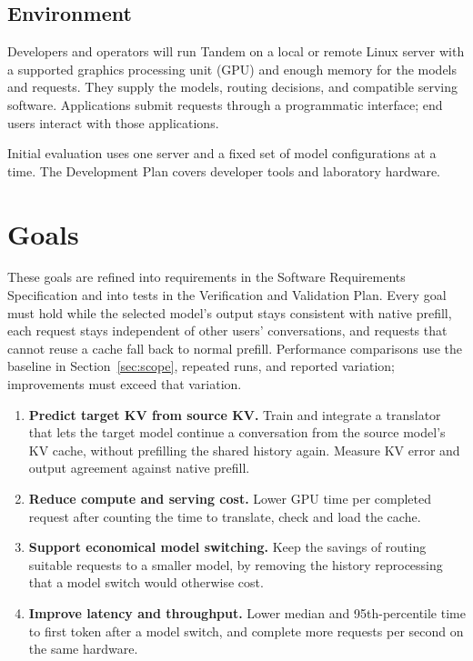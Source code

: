 \documentclass[11pt]{article}
\begin{document}
\subsection{Environment}

Developers and operators will run Tandem on a local or remote Linux server
with a supported graphics processing unit (GPU) and enough memory for the
models and requests. They supply the models, routing decisions, and
compatible serving software. Applications submit requests through a
programmatic interface; end users interact with those applications.

Initial evaluation uses one server and a fixed set of model configurations
at a time. The Development Plan covers developer tools and laboratory
hardware.

\section{Goals}

These goals are refined into requirements in the Software Requirements
Specification and into tests in the Verification and Validation Plan.
Every goal must hold while the selected model's output stays consistent
with native prefill, each request stays independent of other users'
conversations, and requests that cannot reuse a cache fall back to normal
prefill. Performance comparisons use the baseline in
Section~\ref{sec:scope}, repeated runs, and reported variation;
improvements must exceed that variation.

\begin{enumerate}[label=G\arabic*., ref=G\arabic*]
  \item \textbf{Predict target KV from source KV.} Train and integrate a
  translator that lets the target model continue a conversation from the
  source model's KV cache, without prefilling the shared history again.
  Measure KV error and output agreement against native prefill.
  \item \textbf{Reduce compute and serving cost.} Lower GPU time per
  completed request after counting the time to translate, check and load
  the cache.
  \item \textbf{Support economical model switching.} Keep the savings of
  routing suitable requests to a smaller model, by removing the history
  reprocessing that a model switch would otherwise cost.
  \item \textbf{Improve latency and throughput.} Lower median and
  95th-percentile time to first token after a model switch, and complete
  more requests per second on the same hardware.
\end{enumerate}
\end{document}
